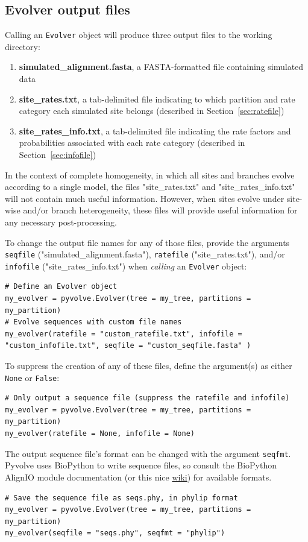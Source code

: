 \documentclass{article}
\newcommand{\code}[1]{\texttt{\small{#1}}}
\begin{document}
\subsection{Evolver output files}\label{sec:output_files}

Calling an \code{Evolver} object will produce three output files to the working directory:
\begin{enumerate}
	\item \textbf{simulated\_alignment.fasta}, a FASTA-formatted file containing simulated data
	\item \textbf{site\_rates.txt}, a tab-delimited file indicating to which partition and rate category each simulated site belongs (described in Section~\ref{sec:ratefile})
	\item \textbf{site\_rates\_info.txt}, a tab-delimited file indicating the rate factors and probabilities associated with each rate category (described in Section~\ref{sec:infofile})
\end{enumerate}


In the context of complete homogeneity, in which all sites and branches evolve according to a single model, the files "site\_rates.txt" and "site\_rates\_info.txt" will not contain much useful information. However, when sites evolve under site-wise and/or branch heterogeneity, these files will provide useful information for any necessary post-processing.

To change the output file names for any of those files, provide the arguments \code{seqfile} ("simulated\_alignment.fasta"), \code{ratefile} ("site\_rates.txt"), and/or \code{infofile} ("site\_rates\_info.txt") when \emph{calling} an \code{Evolver} object:
\begin{lstlisting}
# Define an Evolver object
my_evolver = pyvolve.Evolver(tree = my_tree, partitions = my_partition)
# Evolve sequences with custom file names
my_evolver(ratefile = "custom_ratefile.txt", infofile = "custom_infofile.txt", seqfile = "custom_seqfile.fasta" )
\end{lstlisting}

To suppress the creation of any of these files, define the argument(s) as either \code{None} or \code{False}:
\begin{lstlisting}
# Only output a sequence file (suppress the ratefile and infofile)
my_evolver = pyvolve.Evolver(tree = my_tree, partitions = my_partition)
my_evolver(ratefile = None, infofile = None)
\end{lstlisting}

The output sequence file's format can be changed with the argument \code{seqfmt}. Pyvolve uses BioPython to write sequence files, so consult the BioPython AlignIO module documentation (or this nice \href{http://biopython.org/wiki/AlignIO}{wiki}) for available formats.
\begin{lstlisting}
# Save the sequence file as seqs.phy, in phylip format
my_evolver = pyvolve.Evolver(tree = my_tree, partitions = my_partition)
my_evolver(seqfile = "seqs.phy", seqfmt = "phylip")
\end{lstlisting}
\end{document}
